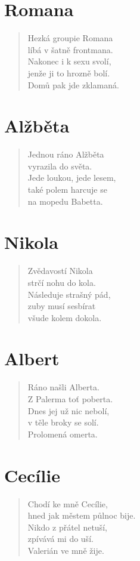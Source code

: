 \section*{Romana}
\begin{verse}
Hezká groupie Romana\\
líbá v šatně frontmana.\\
Nakonec i k sexu svolí,\\
jenže ji to hrozně bolí.\\
Domů pak jde zklamaná.
\end{verse}

\section*{Alžběta}
\begin{verse}
Jednou ráno Alžběta\\
vyrazila do světa.\\
Jede loukou, jede lesem,\\
také polem harcuje se\\
na mopedu Babetta.
\end{verse}

\section*{Nikola}
\begin{verse}
Zvědavostí Nikola\\
strčí nohu do kola.\\
Následuje strašný pád,\\
zuby musí sesbírat\\
všude kolem dokola.
\end{verse}

\section*{Albert}
\begin{verse}
Ráno našli Alberta.\\
Z Palerma toť poberta.\\
Dnes jej už nic nebolí,\\
v těle broky se solí.\\
Prolomená omerta.
\end{verse}

\section*{Cecílie}
\begin{verse}
Chodí ke mně Cecílie,\\
hned jak městem půlnoc bije.\\
Nikdo z přátel netuší,\\
zpívává mi do uší.\\
Valerián ve mně žije.
\end{verse}

